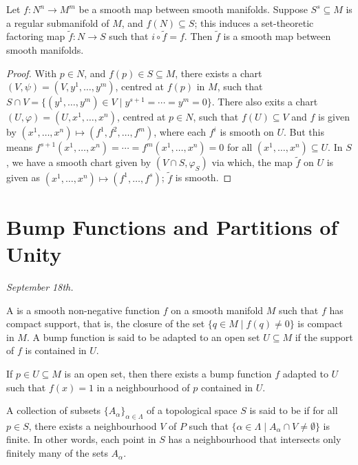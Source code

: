 \begin{theorem}
    Let $f:N^{n} \to M^{m}$ be a smooth map between smooth manifolds. Suppose $S^{s} \subseteq M$ is a regular submanifold of $M$, and $f(N) \subseteq S$; this induces a set-theoretic factoring map $\tilde{f}:N \to S$ such that $i \circ \tilde{f} = f$. Then $\tilde{f}$ is a smooth map between smooth manifolds.
\end{theorem}
\begin{proof}
    With $p \in N$, and $f(p) \in S \subseteq M$, there exists a chart $(V,\psi) = (V,y^{1},\ldots,y^{m})$, centred at $f(p)$ in $M$, such that $S \cap V = \{(y^{1},\ldots,y^{m}) \in V \mid y^{s+1}=\cdots=y^{m}=0\}$. There also exits a chart $(U,\varphi) = (U,x^{1},\ldots,x^{n})$, centred at $p \in N$, such that $f(U) \subseteq V$ and $f$ is given by $(x^{1},\ldots,x^{n}) \mapsto (f^{1},f^{2},\ldots,f^{m})$, where each $f^{i}$ is smooth on $U$. But this means $f^{s+1}(x^{1},\ldots,x^{n}) = \cdots = f^{m}(x^{1},\ldots,x^{n}) = 0$ for all $(x^{1},\ldots,x^{n}) \subseteq U$. In $S$, we have a smooth chart given by $(V \cap S, \varphi_{S})$ via which, the map $\tilde{f}$ on $U$ is given as $(x^{1},\ldots,x^{n}) \mapsto (f^{1},\ldots,f^{s})$; $\tilde{f}$ is smooth.
\end{proof}

\section{Bump Functions and Partitions of Unity}
\textit{September 18th.}

\begin{definition}
    A  is a smooth non-negative function $f$ on a smooth manifold $M$ such that $f$ has compact support, that is, the closure of the set $\{q \in M \mid f(q) \neq 0\}$ is compact in $M$. A bump function is said to be adapted to an open set $U \subseteq M$ if the support of $f$ is contained in $U$.
\end{definition}

If $p \in U \subseteq M$ is an open set, then there exists a bump function $f$ adapted to $U$ such that $f(x) = 1$ in a neighbourhood of $p$ contained in $U$.

\begin{definition}
    A collection of subsets $\{A_{\alpha}\}_{\alpha \in \Lambda}$ of a topological space $S$ is said to be  if for all $p \in S$, there exists a neighbourhood $V$ of $P$ such that $\{\alpha \in \Lambda \mid A_{\alpha} \cap V \neq \emptyset\}$ is finite. In other words, each point in $S$ has a neighbourhood that intersects only finitely many of the sets $A_{\alpha}$.
\end{definition}

